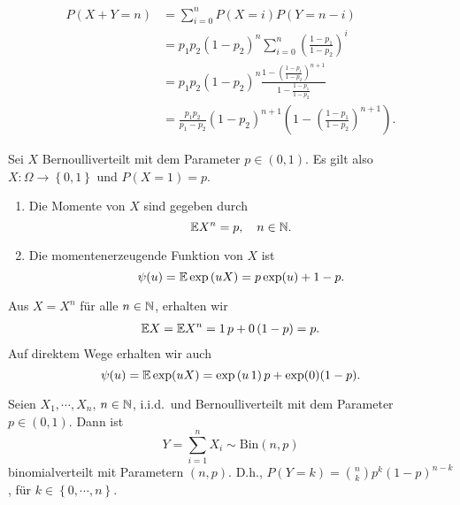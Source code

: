\solution 
\begin{align*}
    P( X+Y = n) &= \sum_{i=0}^{n} P(X=i)P(Y=n-i) \\
    &= p_1 p_2 (1-p_2)^n \sum_{i=0}^{n} \left( \frac{1-p_1}{1-p_2} \right)^{i} \\
    &=  p_1 p_2 (1-p_2)^n \frac{1 - \left( \frac{1-p_1}{1-p_2} \right)^{n+1}}{ 1- \frac{1-p_1}{1-p_2}} \\
    &= \frac{p_1 p_2}{ p_1 -p_2} (1-p_2)^{n+1}\left( 1 - \left( \frac{1-p_1}{1-p_2} \right)^{n+1} \right).
\end{align*}


Sei $X$ Bernoulliverteilt mit dem Parameter $p \in \left( 0,1 \right)$. Es gilt also
$X: \Omega \to \left\{ 0,1 \right\}$ und $P(X=1)=p$. 
\begin{enumerate}
    \item Die Momente von $X$ sind gegeben durch
        \begin{equation*}
            \mathbb{E} X^n = p, \quad n\in\mathbb N.
        \end{equation*}
    \item Die momentenerzeugende Funktion von $X$ ist 
        \begin{equation*}
            \psi(u) = \mathbb{E} \exp \left( u X \right) = p\exp (u)+1-p.
        \end{equation*} 
\end{enumerate}
\solution Aus $X = X^n$ für alle $n\in \mathbb N$, erhalten wir  
\begin{align*}
    \mathbb{E} X = \mathbb{E} X^n = 1\, p + 0\, (1-p) = p.
\end{align*}
Auf direktem Wege erhalten wir auch
\begin{equation*}
    \psi(u) = \mathbb{E} \exp (uX) = \exp\left( u\, 1 \right)p + \exp(0)(1-p).
\end{equation*}



Seien $X_1, \cdots, X_n$, $n\in\mathbb N$, i.i.d.\ und Bernoulliverteilt mit dem Parameter $p\in (0,1)$. 
Dann ist
\begin{equation*}
    Y=\sum_{i=1}^{n} X_i \sim \text{Bin}(n,p)
\end{equation*}
binomialverteilt mit Parametern $(n,p)$. D.h., $P(Y = k) = \binom{n}{k}  p^{k}(1-p)^{n-k}$, 
für $k\in \left\{ 0, \cdots, n \right\}$.

